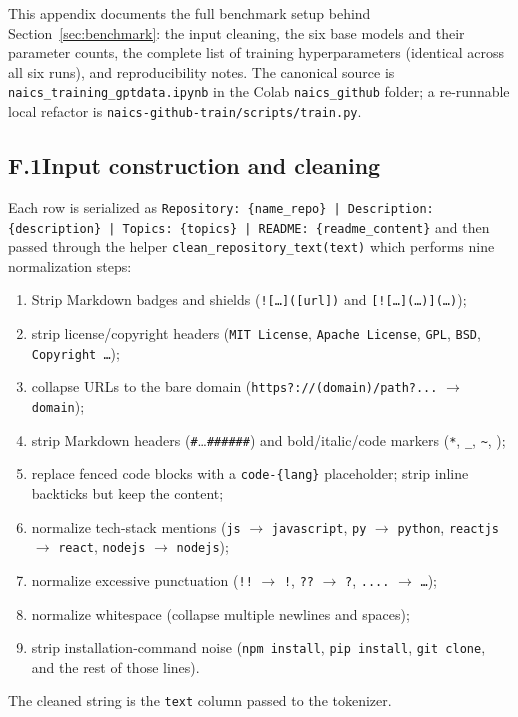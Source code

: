 This appendix documents the full benchmark setup behind Section~\ref{sec:benchmark}: the input cleaning, the six base models and their parameter counts, the complete list of training hyperparameters (identical across all six runs), and reproducibility notes. The canonical source is \texttt{naics\_training\_gptdata.ipynb} in the Colab \texttt{naics\_github} folder; a re-runnable local refactor is \texttt{naics-github-train/scripts/train.py}.

\subsection*{F.1\quad Input construction and cleaning}
Each row is serialized as \texttt{Repository: \{name\_repo\} | Description: \{description\} | Topics: \{topics\} | README: \{readme\_content\}} and then passed through the helper \texttt{clean\_repository\_text(text)} which performs nine normalization steps:
\begin{enumerate}
  \item Strip Markdown badges and shields (\texttt{!{[}\dots{]}({[}url{]})} and \texttt{{[}!{[}\dots{]}(\dots){]}(\dots)});
  \item strip license/copyright headers (\texttt{MIT License}, \texttt{Apache License}, \texttt{GPL}, \texttt{BSD}, \texttt{Copyright \dots});
  \item collapse URLs to the bare domain (\texttt{https?://(domain)/path?...} $\rightarrow$ \texttt{domain});
  \item strip Markdown headers (\texttt{\#}\dots\texttt{\#\#\#\#\#\#}) and bold/italic/code markers (\texttt{*}, \texttt{\_}, \texttt{\textasciitilde}, \texttt{\textasciigrave});
  \item replace fenced code blocks with a \texttt{code-\{lang\}} placeholder; strip inline backticks but keep the content;
  \item normalize tech-stack mentions (\texttt{js} $\rightarrow$ \texttt{javascript}, \texttt{py} $\rightarrow$ \texttt{python}, \texttt{reactjs} $\rightarrow$ \texttt{react}, \texttt{nodejs} $\rightarrow$ \texttt{nodejs});
  \item normalize excessive punctuation (\texttt{!!} $\rightarrow$ \texttt{!}, \texttt{??} $\rightarrow$ \texttt{?}, \texttt{....} $\rightarrow$ \texttt{\dots});
  \item normalize whitespace (collapse multiple newlines and spaces);
  \item strip installation-command noise (\texttt{npm install}, \texttt{pip install}, \texttt{git clone}, and the rest of those lines).
\end{enumerate}
The cleaned string is the \texttt{text} column passed to the tokenizer.


